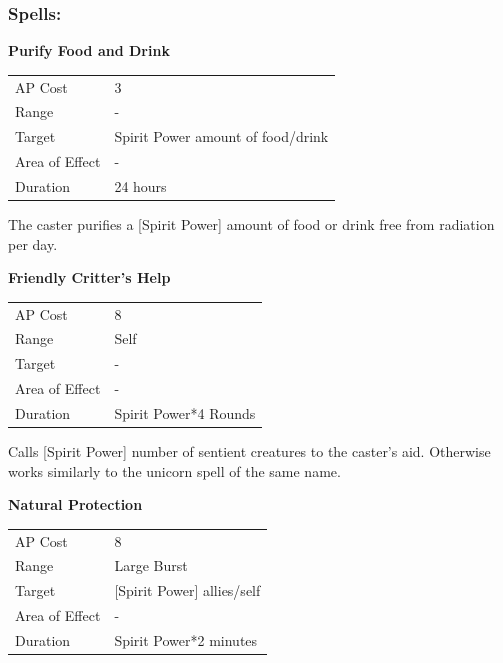 \documentclass[11pt,a4paper,twocolumn]{book}
\begin{document}
\subsubsection*{Spells:}

\smallskip
\noindent
\textbf{Purify Food and Drink}

\smallskip
{
	\begin{tabu} to 70mm{| X[l,4] | X[l,7] |}
		\hline
        AP Cost	      	& 3 						\\
        Range     		& -				\\
        Target      	& Spirit Power amount of food/drink		\\
        Area of Effect  & -  	 			\\
        Duration     	& 24 hours		\\ \hline
	\end{tabu}
		
}
\smallskip

The caster purifies a [Spirit Power] amount of food or drink free from radiation per day.

\bigskip
\noindent
\textbf{Friendly Critter's Help}

\smallskip
{
	\begin{tabu} to 70mm{| X[l,4] | X[l,7] |}
		\hline
        AP Cost	      	& 8 						\\
        Range     		& Self				\\
        Target      	& -		\\
        Area of Effect  & -  	 			\\
        Duration     	& Spirit Power*4 Rounds		\\ \hline
	\end{tabu}
		
}
\smallskip

Calls [Spirit Power] number of sentient creatures to the caster's aid. Otherwise works similarly to the unicorn spell of the same name.

\bigskip
\noindent
\textbf{Natural Protection}

\smallskip
{
	\begin{tabu} to 70mm{| X[l,4] | X[l,7] |}
		\hline
        AP Cost	      	& 8 						\\
        Range     		& Large Burst				\\
        Target      	& [Spirit Power] allies/self		\\
        Area of Effect  & -  	 			\\
        Duration     	& Spirit Power*2 minutes		\\ \hline
	\end{tabu}
		
}
\smallskip
\end{document}
